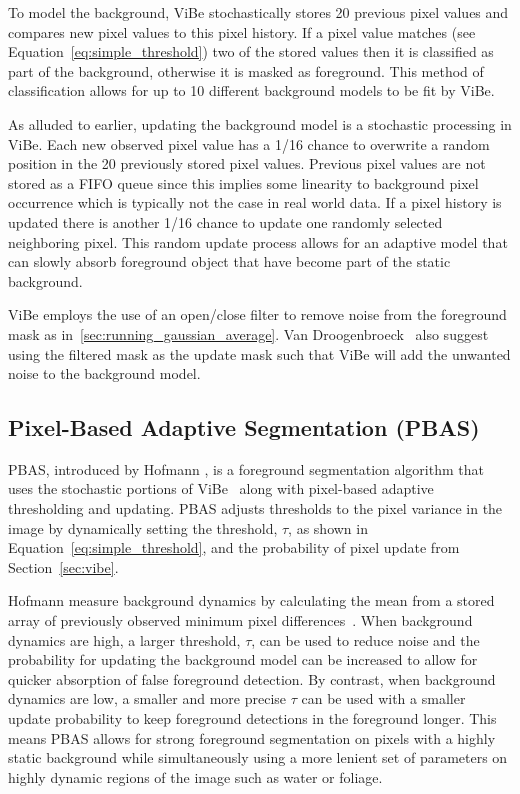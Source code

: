 To model the background, ViBe stochastically stores 20 previous pixel values and compares new pixel values to this pixel history. If a pixel value matches (see Equation~\ref{eq:simple_threshold}) two of the stored values then it is classified as part of the background, otherwise it is masked as foreground. This method of classification allows for up to 10 different background models to be fit by ViBe.

As alluded to earlier, updating the background model is a stochastic processing in ViBe. Each new observed pixel value has a 1/16 chance to overwrite a random position in the 20 previously stored pixel values. Previous pixel values are not stored as a FIFO queue since this implies some linearity to background pixel occurrence which is typically not the case in real world data. If a pixel history is updated there is another 1/16 chance to update one randomly selected neighboring pixel. This random update process allows for an adaptive model that can slowly absorb foreground object that have become part of the static background.

ViBe employs the use of an open/close filter to remove noise from the foreground mask as in~\ref{sec:running_gaussian_average}. Van Droogenbroeck~\etal{}\cite{van_2014_vibe} also suggest using the filtered mask as the update mask such that ViBe will add the unwanted noise to the background model.


\subsection{Pixel-Based Adaptive Segmentation (PBAS)}
\label{sec:pbas}
PBAS, introduced by Hofmann \etal\cite{hofmann_2012_background}, is a foreground segmentation algorithm that uses the stochastic portions of ViBe~\cite{van_2014_vibe} along with pixel-based adaptive thresholding and updating. PBAS adjusts thresholds to the pixel variance in the image by dynamically setting the threshold, $\tau$, as shown in Equation~\ref{eq:simple_threshold}, and the probability of pixel update from Section~\ref{sec:vibe}.

Hofmann \etal\cite{hofmann_2012_background} measure background dynamics by calculating the mean from a stored array of previously observed minimum pixel differences~\cite{hofmann_2012_background}. When background dynamics are high, a larger threshold, $\tau$, can be used to reduce noise and the probability for updating the background model can be increased to allow for quicker absorption of false foreground detection. By contrast, when background dynamics are low, a smaller and more precise $\tau$ can be used with a smaller update probability to keep foreground detections in the foreground longer. This means PBAS allows for strong foreground segmentation on pixels with a highly static background while simultaneously using a more lenient set of parameters on highly dynamic regions of the image such as water or foliage.


